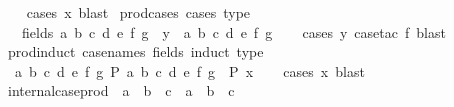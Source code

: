 \begin{isabellebody}
%
\isadelimproof
\ \ %
\endisadelimproof
%
\isatagproof
{}\isamarkupfalse%
\ {\isacharparenleft}{\kern0pt}cases\ x{\isacharparenright}{\kern0pt}\ blast%
\endisatagproof
{\isafoldproof}%
%
\isadelimproof
\isanewline
%
\endisadelimproof
\isanewline
{}\isamarkupfalse%
\ prod{\isacharunderscore}{\kern0pt}cases{}\ {\isacharbrackleft}{\kern0pt}cases\ type{\isacharbrackright}{\kern0pt}{\isacharcolon}{\kern0pt}\isanewline
\ \ \ {\isacharparenleft}{\kern0pt}fields{\isacharparenright}{\kern0pt}\ a\ b\ c\ d\ e\ f\ g\ \ {\isachardoublequoteopen}y\ {\isacharequal}{\kern0pt}\ {\isacharparenleft}{\kern0pt}a{\isacharcomma}{\kern0pt}\ b{\isacharcomma}{\kern0pt}\ c{\isacharcomma}{\kern0pt}\ d{\isacharcomma}{\kern0pt}\ e{\isacharcomma}{\kern0pt}\ f{\isacharcomma}{\kern0pt}\ g{\isacharparenright}{\kern0pt}{\isachardoublequoteclose}\isanewline
%
\isadelimproof
\ \ %
\endisadelimproof
%
\isatagproof
{}\isamarkupfalse%
\ {\isacharparenleft}{\kern0pt}cases\ y{\isacharcomma}{\kern0pt}\ case{\isacharunderscore}{\kern0pt}tac\ f{\isacharparenright}{\kern0pt}\ blast%
\endisatagproof
{\isafoldproof}%
%
\isadelimproof
\isanewline
%
\endisadelimproof
\isanewline
{}\isamarkupfalse%
\ prod{\isacharunderscore}{\kern0pt}induct{}\ {\isacharbrackleft}{\kern0pt}case{\isacharunderscore}{\kern0pt}names\ fields{\isacharcomma}{\kern0pt}\ induct\ type{\isacharbrackright}{\kern0pt}{\isacharcolon}{\kern0pt}\isanewline
\ \ {\isachardoublequoteopen}{\isacharparenleft}{\kern0pt}{\isasymAnd}a\ b\ c\ d\ e\ f\ g{\isachardot}{\kern0pt}\ P\ {\isacharparenleft}{\kern0pt}a{\isacharcomma}{\kern0pt}\ b{\isacharcomma}{\kern0pt}\ c{\isacharcomma}{\kern0pt}\ d{\isacharcomma}{\kern0pt}\ e{\isacharcomma}{\kern0pt}\ f{\isacharcomma}{\kern0pt}\ g{\isacharparenright}{\kern0pt}{\isacharparenright}{\kern0pt}\ {\isasymLongrightarrow}\ P\ x{\isachardoublequoteclose}\isanewline
%
\isadelimproof
\ \ %
\endisadelimproof
%
\isatagproof
{}\isamarkupfalse%
\ {\isacharparenleft}{\kern0pt}cases\ x{\isacharparenright}{\kern0pt}\ blast%
\endisatagproof
{\isafoldproof}%
%
\isadelimproof
\isanewline
%
\endisadelimproof
\isanewline
{}\isamarkupfalse%
\ internal{\isacharunderscore}{\kern0pt}case{\isacharunderscore}{\kern0pt}prod\ {\isacharcolon}{\kern0pt}{\isacharcolon}{\kern0pt}\ {\isachardoublequoteopen}{\isacharparenleft}{\kern0pt}{\isacharprime}{\kern0pt}a\ {\isasymRightarrow}\ {\isacharprime}{\kern0pt}b\ {\isasymRightarrow}\ {\isacharprime}{\kern0pt}c{\isacharparenright}{\kern0pt}\ {\isasymRightarrow}\ {\isacharprime}{\kern0pt}a\ {\isasymtimes}\ {\isacharprime}{\kern0pt}b\ {\isasymRightarrow}\ {\isacharprime}{\kern0pt}c{\isachardoublequoteclose}\isanewline

\end{isabellebody}
